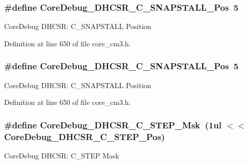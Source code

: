 \subsubsection[{\texorpdfstring{Core\+Debug\+\_\+\+D\+H\+C\+S\+R\+\_\+\+C\+\_\+\+S\+N\+A\+P\+S\+T\+A\+L\+L\+\_\+\+Pos}{CoreDebug_DHCSR_C_SNAPSTALL_Pos}}]{\setlength{\rightskip}{0pt plus 5cm}\#define Core\+Debug\+\_\+\+D\+H\+C\+S\+R\+\_\+\+C\+\_\+\+S\+N\+A\+P\+S\+T\+A\+L\+L\+\_\+\+Pos~5}\hypertarget{group___c_m_s_i_s___c_m3___core_debug_ga85747214e2656df6b05ec72e4d22bd6d}{}\label{group___c_m_s_i_s___c_m3___core_debug_ga85747214e2656df6b05ec72e4d22bd6d}
Core\+Debug D\+H\+C\+SR\+: C\+\_\+\+S\+N\+A\+P\+S\+T\+A\+LL Position 

Definition at line 650 of file core\+\_\+cm3.\+h.

\subsubsection[{\texorpdfstring{Core\+Debug\+\_\+\+D\+H\+C\+S\+R\+\_\+\+C\+\_\+\+S\+N\+A\+P\+S\+T\+A\+L\+L\+\_\+\+Pos}{CoreDebug_DHCSR_C_SNAPSTALL_Pos}}]{\setlength{\rightskip}{0pt plus 5cm}\#define Core\+Debug\+\_\+\+D\+H\+C\+S\+R\+\_\+\+C\+\_\+\+S\+N\+A\+P\+S\+T\+A\+L\+L\+\_\+\+Pos~5}\hypertarget{group___c_m_s_i_s___c_m3___core_debug_ga85747214e2656df6b05ec72e4d22bd6d}{}\label{group___c_m_s_i_s___c_m3___core_debug_ga85747214e2656df6b05ec72e4d22bd6d}
Core\+Debug D\+H\+C\+SR\+: C\+\_\+\+S\+N\+A\+P\+S\+T\+A\+LL Position 

Definition at line 650 of file core\+\_\+cm3.\+h.

\subsubsection[{\texorpdfstring{Core\+Debug\+\_\+\+D\+H\+C\+S\+R\+\_\+\+C\+\_\+\+S\+T\+E\+P\+\_\+\+Msk}{CoreDebug_DHCSR_C_STEP_Msk}}]{\setlength{\rightskip}{0pt plus 5cm}\#define Core\+Debug\+\_\+\+D\+H\+C\+S\+R\+\_\+\+C\+\_\+\+S\+T\+E\+P\+\_\+\+Msk~(1ul $<$$<$ Core\+Debug\+\_\+\+D\+H\+C\+S\+R\+\_\+\+C\+\_\+\+S\+T\+E\+P\+\_\+\+Pos)}\hypertarget{group___c_m_s_i_s___c_m3___core_debug_gae6bda72fbd32cc5734ff3542170dc00d}{}\label{group___c_m_s_i_s___c_m3___core_debug_gae6bda72fbd32cc5734ff3542170dc00d}
Core\+Debug D\+H\+C\+SR\+: C\+\_\+\+S\+T\+EP Mask 

